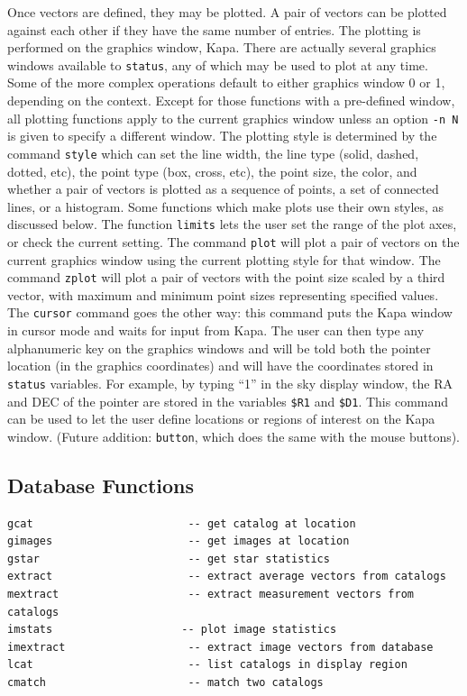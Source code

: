 \documentclass{article}
\begin{document}
Once vectors are defined, they may be plotted.  A pair of vectors can
be plotted against each other if they have the same number of entries.
The plotting is performed on the graphics window, Kapa.  There are
actually several graphics windows available to {\tt status}, any of
which may be used to plot at any time.  Some of the more complex
operations default to either graphics window 0 or 1, depending on the
context.  Except for those functions with a pre-defined window, all
plotting functions apply to the current graphics window unless an
option {\tt -n N} is given to specify a different window.  The
plotting style is determined by the command {\tt style} which can set
the line width, the line type (solid, dashed, dotted, etc), the point
type (box, cross, etc), the point size, the color, and whether a pair
of vectors is plotted as a sequence of points, a set of connected
lines, or a histogram.  Some functions which make plots use their own
styles, as discussed below.  The function {\tt limits} lets the user
set the range of the plot axes, or check the current setting.  The
command {\tt plot} will plot a pair of vectors on the current graphics
window using the current plotting style for that window.  The command
{\tt zplot} will plot a pair of vectors with the point size scaled by
a third vector, with maximum and minimum point sizes representing
specified values.  The {\tt cursor} command goes the other way: this
command puts the Kapa window in cursor mode and waits for input from
Kapa.  The user can then type any alphanumeric key on the graphics
windows and will be told both the pointer location (in the graphics
coordinates) and will have the coordinates stored in {\tt status}
variables.  For example, by typing ``1'' in the sky display window,
the RA and DEC of the pointer are stored in the variables {\tt \$R1}
and {\tt \$D1}.  This command can be used to let the user define
locations or regions of interest on the Kapa window. (Future addition:
{\tt button}, which does the same with the mouse buttons).  

\subsection{Database Functions}

\begin{verbatim}
gcat                        -- get catalog at location
gimages                     -- get images at location
gstar                       -- get star statistics
extract                     -- extract average vectors from catalogs
mextract                    -- extract measurement vectors from catalogs
imstats                    -- plot image statistics
imextract                   -- extract image vectors from database
lcat                        -- list catalogs in display region
cmatch                      -- match two catalogs
\end{verbatim}
\end{document}
